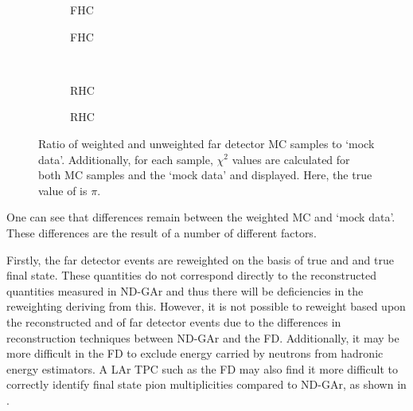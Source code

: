 \begin{figure}[h]
	\begin{subfigure}[t]{.5\linewidth}
		\begin{adjustbox}{max totalsize=\linewidth, center}
			
		\end{adjustbox}
		\caption{FHC \numu}
	\end{subfigure}
	\hfill
	\begin{subfigure}[t]{.5\linewidth}
		\begin{adjustbox}{max totalsize=\linewidth, center}
			
		\end{adjustbox}
		\caption{FHC \nue}
	\end{subfigure} \\
	\begin{subfigure}[t]{.5\linewidth}
		\begin{adjustbox}{max totalsize=\linewidth, center}
			
		\end{adjustbox}
		\caption{RHC \anumu}
	\end{subfigure}
	\hfill
	\begin{subfigure}[t]{.5\linewidth}
		\begin{adjustbox}{max totalsize=\linewidth, center}
			
		\end{adjustbox}
		\caption{RHC \anue}
	\end{subfigure}
	\caption[Ratio of weighted and unweighted far detector MC samples to `mock data']{Ratio of weighted and unweighted far detector MC samples to `mock data'. Additionally, for each sample, $\chi^{2}$ values are calculated for both MC samples and the `mock data' and displayed. Here, the true value of \dcp is $\pi$.}
	\label{fig:reweightedSamplesRatio}
\end{figure} 

One can see that differences remain between the weighted MC and `mock data'. 
These differences are the result of a number of different factors.

Firstly, the far detector events are reweighted on the basis of true \evis and \pvis and true final state.
These quantities do not correspond directly to the reconstructed quantities measured in ND-GAr and thus there will be deficiencies in the reweighting deriving from this.
However, it is not possible to reweight based upon the reconstructed \evis and \pvis of far detector events due to the differences in reconstruction techniques between ND-GAr and the FD.
Additionally, it may be more difficult in the FD to exclude energy carried by neutrons from hadronic energy estimators.
A LAr TPC such as the FD may also find it more difficult to correctly identify final state pion multiplicities compared to ND-GAr, as shown in .

